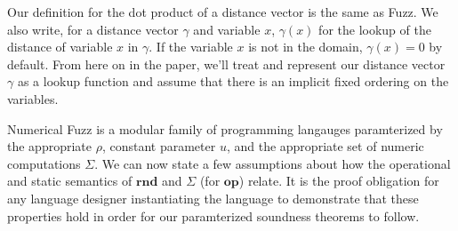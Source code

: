 Our definition for the dot product of a distance vector is the same as Fuzz. We
also write, for a distance vector $\gamma$ and variable $x$, $\gamma(x)$ for the
lookup of the distance of variable $x$ in $\gamma$. If the variable $x$ is not
in the domain, $\gamma(x) = 0$ by default. From here on in the paper, we'll
treat and represent our distance vector $\gamma$ as a lookup function and assume
that there is an implicit fixed ordering on the variables.

Numerical Fuzz is a modular family of programming langauges paramterized by the
appropriate $\rho$, constant parameter $u$, and the appropriate set of numeric
computations $\Sigma$.  
We can now state a few assumptions about how the operational and static
semantics of $\mathbf{rnd}$ and $\Sigma$ (for $\mathbf{op}$) relate.
It is the proof obligation for any language designer instantiating the language
to demonstrate that these properties hold in order for our paramterized
soundness theorems to follow.
